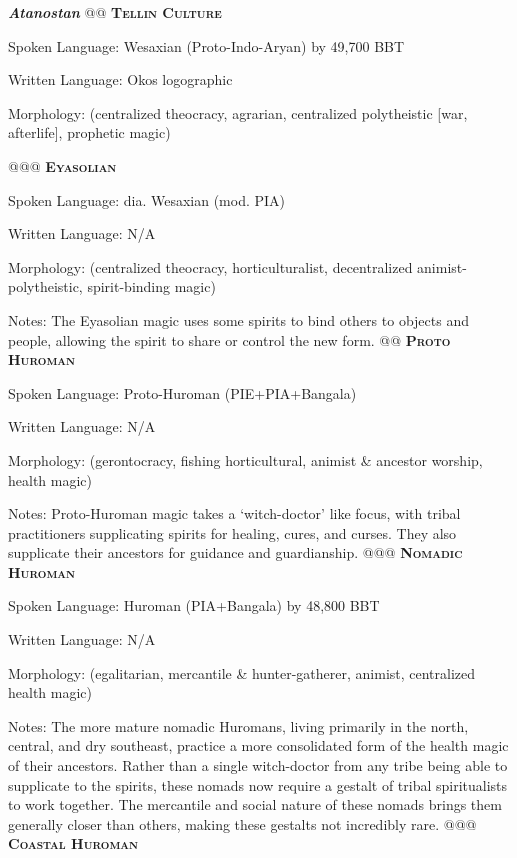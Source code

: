 \documentclass[12pt]{article}
\begin{document}
\begin{easylist}
	\vspace{0.25in}
	\textbf{\textit{Atanostan}}
	@@ \textsc{\textbf{Tellin Culture}}
	
	\normalfont Spoken Language: Wesaxian (Proto-Indo-Aryan) by 49,700 BBT
	
	Written Language: Okos logographic
	
	Morphology: (centralized theocracy, agrarian, centralized polytheistic [war, afterlife], prophetic magic)
	
	@@@ \textsc{\textbf{Eyasolian}}
	
	\normalfont Spoken Language: dia. Wesaxian (mod. PIA)
	
	Written Language: N/A
	
	Morphology: (centralized theocracy, horticulturalist, decentralized animist-polytheistic, spirit-binding magic)
	
	{\footnotesize Notes: The Eyasolian magic uses some spirits to bind others to objects and people, allowing the spirit to share or control the new form.}
	@@ \textsc{\textbf{Proto Huroman}}

	\normalfont Spoken Language: Proto-Huroman (PIE+PIA+Bangala)
	
	Written Language: N/A
	
	Morphology: (gerontocracy, fishing horticultural, animist \& ancestor worship, health magic)
	
	{\footnotesize Notes: Proto-Huroman magic takes a `witch-doctor' like focus, with tribal practitioners supplicating spirits for healing, cures, and curses. They also supplicate their ancestors for guidance and guardianship.}
	@@@ \textsc{\textbf{Nomadic Huroman}}
	
	\normalfont Spoken Language: Huroman (PIA+Bangala) by 48,800 BBT
	
	Written Language: N/A
	
	Morphology: (egalitarian, mercantile \& hunter-gatherer, animist, centralized health magic)
	
	{\footnotesize Notes: The more mature nomadic Huromans, living primarily in the north, central, and dry southeast, practice a more consolidated form of the health magic of their ancestors. Rather than a single witch-doctor from any tribe being able to supplicate to the spirits, these nomads now require a gestalt of tribal spiritualists to work together. The mercantile and social nature of these nomads brings them generally closer than others, making these gestalts not incredibly rare.}
	@@@ \textsc{\textbf{Coastal Huroman}}
	

\end{easylist}
\end{document}
